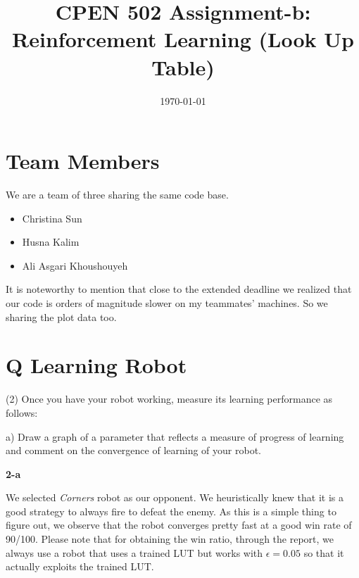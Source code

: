 \documentclass[a4paper,12pt]{article}
\title{CPEN 502 Assignment-b: Reinforcement Learning (Look Up Table)}
\author{\authorName}
\date{\today}
\begin{document}
\maketitle

\section{Team Members}
We are a team of three sharing the same code base. 
\begin{itemize}
\item Christina Sun
\item Husna Kalim
\item Ali Asgari Khoushouyeh
\end{itemize}


It is noteworthy to mention that close to the extended deadline we realized that our code is orders of magnitude slower on my teammates' machines. So we sharing the plot data too. 
\pagebreak
\section{Q Learning Robot}
(2) Once you have your robot working, measure its learning performance as follows:

a) Draw a graph of a parameter that reflects a measure of progress of learning and comment on the convergence of learning of your robot.
\begin{center}

\textbf{2-a}
\end{center}
We selected \emph{Corners} robot as our opponent. We heuristically knew that it is a good strategy to always fire to defeat the enemy. As this is a simple thing to figure out, we observe that the robot converges pretty fast at a good win rate of 90/100. Please note that for obtaining the win ratio, through the report, we always use a robot that uses a trained LUT but works with $\epsilon=0.05$ so that it actually exploits the trained LUT. 
\end{document}
